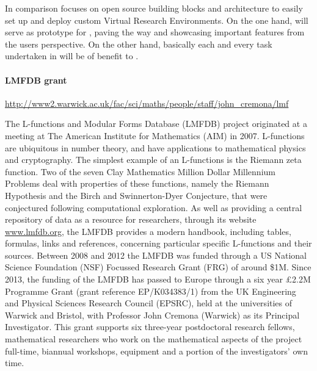 
In comparison \TheProject focuses on open source building blocks and
architecture to easily set up and deploy custom Virtual Research
Environments. On the one hand, \SMC will serve as prototype for
\TheProject, paving the way and showcasing important features from the
users perspective. On the other hand, basically each and every task
undertaken in \TheProject will be of benefit to \SMC.


\paragraph{LMFDB grant}\url{http://www2.warwick.ac.uk/fac/sci/maths/people/staff/john_cremona/lmf}

The L-functions and Modular Forms Database (LMFDB) project originated
at a meeting at The American Institute for Mathematics (AIM) in 2007.
L-functions are ubiquitous in number theory, and have applications to
mathematical physics and cryptography. The simplest example of an
L-functions is the Riemann zeta function. Two of the seven Clay
Mathematics Million Dollar Millennium Problems deal with properties of
these functions, namely the Riemann Hypothesis and the Birch and
Swinnerton-Dyer Conjecture, that were conjectured following
computational exploration.  As well as providing a central repository
of data as a resource for researchers, through its website
\url{www.lmfdb.org}, the LMFDB provides a modern handbook, including
tables, formulas, links and references, concerning particular specific
L-functions and their sources.  Between 2008 and 2012 the LMFDB was
funded through a US National Science Foundation (NSF) Focussed
Research Grant (FRG) of around \$1M.  Since 2013, the funding of the%
LMFDB has passed to Europe through a six year £2.2M Programme Grant
(grant reference EP/K034383/1) from the UK Engineering and Physical
Sciences Research Council (EPSRC), held at the universities of Warwick
and Bristol, with Professor John Cremona (Warwick) as its Principal
Investigator.  This grant supports six three-year postdoctoral
research fellows, mathematical researchers who work on the
mathematical aspects of the project full-time, biannual workshops,
equipment and a portion of the investigators' own time.

